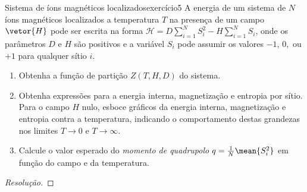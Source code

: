 \begin{exercício}{Sistema de íons magnéticos localizados}{exercício5}
    A energia de um sistema de \(N\) íons magnéticos localizados a temperatura \(T\) na presença de um campo \(\vetor{H}\) pode ser escrita na forma \(\mathcal{H} = D \sum_{i = 1}^N S_i^2 - H \sum_{i = 1}^N S_i\), onde os parâmetros \(D\) e \(H\) são positivos e a variável \(S_i\) pode assumir os valores \(-1\), \(0,\) ou \(+1\) para qualquer sítio \(i\).
    \begin{enumerate}[label=(\alph*)]
        \item Obtenha a função de partição \(Z(T, H, D)\) do sistema.
        \item Obtenha expressões para a energia interna, magnetização e entropia por sítio. Para o campo \(H\) nulo, esboce gráficos da energia interna, magnetização e entropia contra a temperatura, indicando o comportamento destas grandezas nos limites \(T \to 0\) e \(T \to \infty\).

        \item Calcule o valor esperado do \emph{momento de quadrupolo} \(q = \frac{1}{N} \mean{S_i^2}\) em função do campo e da temperatura.
    \end{enumerate}
\end{exercício}
\begin{proof}[Resolução]

\end{proof}
